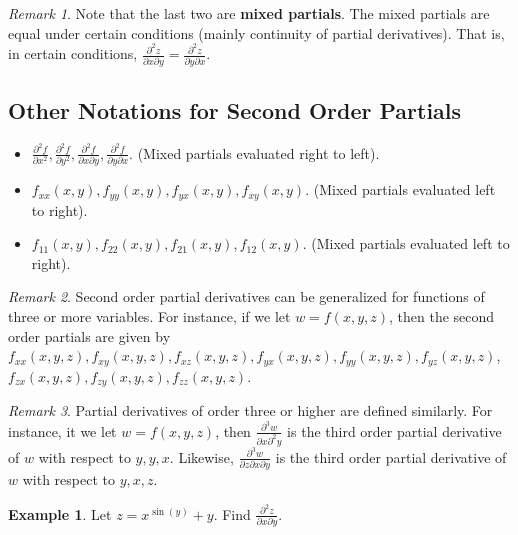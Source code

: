 \documentclass[11pt]{article}
\theoremstyle{plain} %
\theoremstyle{definition}
\theoremstyle{example}
\newtheorem*{example}{Example}
\theoremstyle{remark}
\newtheorem*{remark}{Remark}
\begin{document}
\begin{remark}
Note that the last two are \textbf{mixed partials}. The mixed partials are equal under certain conditions (mainly continuity of partial derivatives). That is, in certain conditions, $\frac{\partial ^2 z}{\partial x \partial y} = \frac{\partial ^2 z}{\partial y \partial x}$.

\end{remark}

\subsection{Other Notations for Second Order Partials}

\begin{itemize}
	\item $\frac{\partial ^2 f}{\partial x^2}, \frac{\partial ^2 f}{\partial y^2}, \frac{\partial ^2 f}{\partial x\partial y}, \frac{\partial ^2 f}{\partial y \partial x}$. (Mixed partials evaluated right to left).
	\item $f_{xx}(x, y), f_{yy}(x, y), f_{yx}(x, y), f_{xy}(x, y)$. (Mixed partials evaluated left to right).
	\item $f_{11}(x, y), f_{22}(x, y), f_{21}(x, y), f_{12}(x, y)$. (Mixed partials evaluated left to right).
\end{itemize}


\begin{remark}
Second order partial derivatives can be generalized for functions of three or more variables. For instance, if we let $w = f(x, y, z)$, then the second order partials are given by $f_{xx}(x, y, z), f_{xy}(x, y, z), f_{xz}(x, y, z), f_{yx}(x, y, z), f_{yy}(x, y, z), f_{yz}(x, y, z)$, $f_{zx}(x, y, z), f_{zy}(x, y, z), f_{zz}(x, y, z)$.
\end{remark}

\begin{remark}
Partial derivatives of order three or higher are defined similarly. For instance, it we let $w = f(x, y, z)$, then $\frac{\partial^3 w}{\partial x \partial ^2y}$ is the third order partial derivative of $w$ with respect to $y, y, x$. Likewise,  $\frac{\partial^3 w}{\partial z \partial x \partial y}$ is the third order partial derivative of $w$ with respect to $y, x, z$.
\end{remark}

\begin{example}
Let $z=x^{\sin(y)}+y$. Find $\frac{\partial ^2 z}{\partial x \partial y}$.
\end{example}
\end{document}
